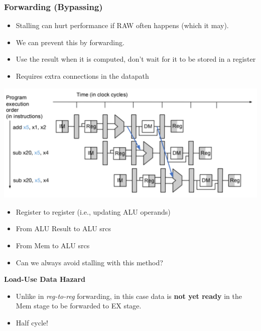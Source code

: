 \documentclass[10pt]{article}
\begin{document}
\subsubsection*{Forwarding (Bypassing)}
\begin{itemize}
    \item Stalling can hurt performance if RAW often happens (which it may).
    \item We can prevent this by forwarding.
    \item Use the result when it is computed, don't wait for it to be stored in a register
    \item Requires extra connections in the datapath
\end{itemize}
\begin{center}
    \includegraphics*[scale=0.35]{W3_11.png}
\end{center}
\begin{itemize}
    \item Register to register (i.e., updating ALU operands)
    \item From ALU Result to ALU srcs
    \item From Mem to ALU srcs
    \item Can we always avoid stalling with this method?
\end{itemize}
\textbf{Load-Use Data Hazard}\\
\begin{itemize}
    \item Unlike in \textit{reg-to-reg} forwarding, in this case data is \textbf{not yet ready} in the Mem stage to be forwarded to EX stage.
    \item Half cycle!
\end{itemize}
\end{document}
